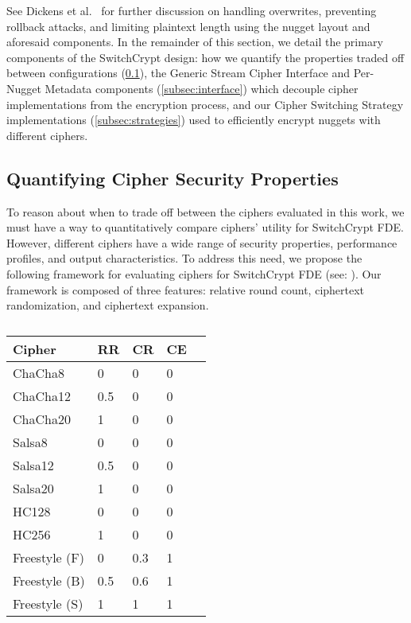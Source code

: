 See Dickens et al.~\cite{StrongBox} for further discussion on handling
overwrites, preventing rollback attacks, and limiting plaintext length using the
nugget layout and aforesaid components. In the remainder of this section, we
detail the primary components of the SwitchCrypt design: how we quantify the
properties traded off between configurations (\cref{subsec:quantify}), the
Generic Stream Cipher Interface and Per-Nugget Metadata components
(\cref{subsec:interface}) which decouple cipher implementations from the
encryption process, and our Cipher Switching Strategy implementations
(\cref{subsec:strategies}) used to efficiently encrypt nuggets with different
ciphers.

\subsection{Quantifying Cipher Security Properties} \label{subsec:quantify}

To reason about when to trade off between the ciphers evaluated in this work, we
must have a way to quantitatively compare ciphers' utility for SwitchCrypt FDE.
However, different ciphers have a wide range of security properties, performance
profiles, and output characteristics. To address this need, we propose the
following framework for evaluating ciphers for SwitchCrypt FDE (see:
). Our framework is composed of three features: relative
round count, ciphertext randomization, and ciphertext expansion.

\begin{table}[]
   \begin{tabular}{@{}lllll@{}}
   \toprule
   \textbf{Cipher} & \textbf{RR} & \textbf{CR} & \textbf{CE} \\ \midrule
   ChaCha8         & 0           & 0           & 0           \\
   ChaCha12        & 0.5         & 0           & 0           \\
   ChaCha20        & 1           & 0           & 0           \\
   Salsa8          & 0           & 0           & 0           \\
   Salsa12         & 0.5         & 0           & 0           \\
   Salsa20         & 1           & 0           & 0           \\
   HC128           & 0           & 0           & 0           \\
   HC256           & 1           & 0           & 0           \\
   Freestyle (F)   & 0           & 0.3         & 1           \\
   Freestyle (B)   & 0.5         & 0.6         & 1           \\
   Freestyle (S)   & 1           & 1           & 1           \\
\end{tabular}
   \caption{}
   \label{tbl:security-quant}
 \end{table}

